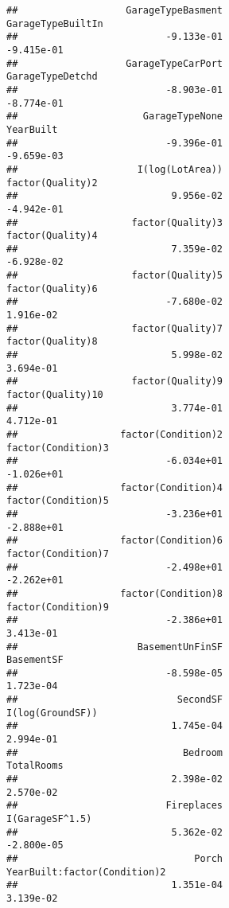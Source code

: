 \documentclass[
]{article}
\begin{document}
\begin{verbatim}
##                   GarageTypeBasment                    GarageTypeBuiltIn  
##                          -9.133e-01                           -9.415e-01  
##                   GarageTypeCarPort                     GarageTypeDetchd  
##                          -8.903e-01                           -8.774e-01  
##                      GarageTypeNone                            YearBuilt  
##                          -9.396e-01                           -9.659e-03  
##                     I(log(LotArea))                     factor(Quality)2  
##                           9.956e-02                           -4.942e-01  
##                    factor(Quality)3                     factor(Quality)4  
##                           7.359e-02                           -6.928e-02  
##                    factor(Quality)5                     factor(Quality)6  
##                          -7.680e-02                            1.916e-02  
##                    factor(Quality)7                     factor(Quality)8  
##                           5.998e-02                            3.694e-01  
##                    factor(Quality)9                    factor(Quality)10  
##                           3.774e-01                            4.712e-01  
##                  factor(Condition)2                   factor(Condition)3  
##                          -6.034e+01                           -1.026e+01  
##                  factor(Condition)4                   factor(Condition)5  
##                          -3.236e+01                           -2.888e+01  
##                  factor(Condition)6                   factor(Condition)7  
##                          -2.498e+01                           -2.262e+01  
##                  factor(Condition)8                   factor(Condition)9  
##                          -2.386e+01                            3.413e-01  
##                     BasementUnFinSF                           BasementSF  
##                          -8.598e-05                            1.723e-04  
##                            SecondSF                     I(log(GroundSF))  
##                           1.745e-04                            2.994e-01  
##                             Bedroom                           TotalRooms  
##                           2.398e-02                            2.570e-02  
##                          Fireplaces                      I(GarageSF^1.5)  
##                           5.362e-02                           -2.800e-05  
##                               Porch         YearBuilt:factor(Condition)2  
##                           1.351e-04                            3.139e-02  

\end{verbatim}
\end{document}
